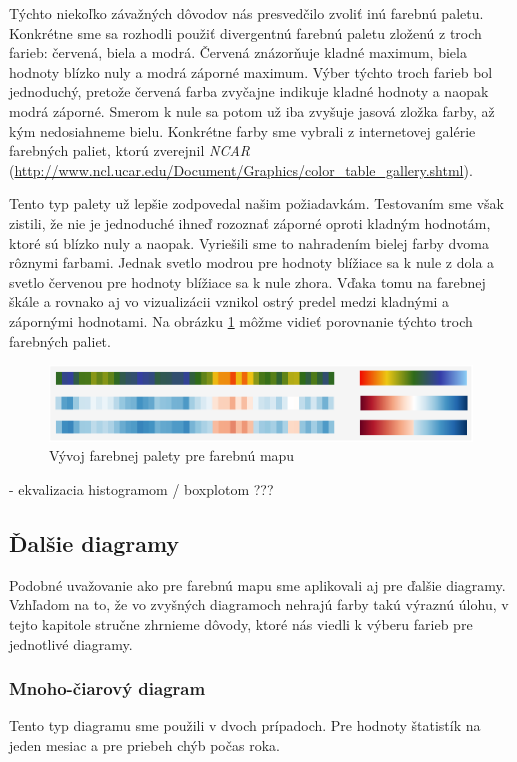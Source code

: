 Týchto niekoľko závažných dôvodov nás presvedčilo zvoliť inú farebnú paletu. Konkrétne sme sa rozhodli použiť divergentnú farebnú paletu zloženú z troch farieb: červená, biela a modrá. Červená znázorňuje kladné maximum, biela hodnoty blízko nuly a modrá záporné maximum. Výber týchto troch farieb bol jednoduchý, pretože červená farba zvyčajne indikuje kladné hodnoty a naopak modrá záporné. Smerom k nule sa potom už iba zvyšuje jasová zložka farby, až kým nedosiahneme bielu. Konkrétne farby sme vybrali z internetovej galérie farebných paliet, ktorú zverejnil \textit{NCAR} (\url{http://www.ncl.ucar.edu/Document/Graphics/color_table_gallery.shtml}).

Tento typ palety už lepšie zodpovedal našim požiadavkám. Testovaním sme však zistili, že nie je jednoduché ihneď rozoznať záporné oproti kladným hodnotám, ktoré sú blízko nuly a naopak. Vyriešili sme to nahradením bielej farby dvoma rôznymi farbami. Jednak svetlo modrou pre hodnoty blížiace sa k nule z dola a svetlo červenou pre hodnoty blížiace sa k nule zhora. Vďaka tomu na farebnej škále a rovnako aj vo vizualizácii vznikol ostrý predel medzi kladnými a zápornými hodnotami. Na obrázku \ref{fig:colorpalettes} môžme vidieť porovnanie týchto troch farebných paliet.


\begin{figure}
	\centering
	\includegraphics[width = 5in]{colorpalettes}
	\caption{Vývoj farebnej palety pre farebnú mapu}
	\label{fig:colorpalettes}
\end{figure}

- ekvalizacia histogramom / boxplotom ??? \\

\subsection{Ďalšie diagramy}
Podobné uvažovanie ako pre farebnú mapu sme aplikovali aj pre ďalšie diagramy. Vzhľadom na to, že vo zvyšných diagramoch nehrajú farby takú výraznú úlohu, v tejto kapitole stručne zhrnieme dôvody, ktoré nás viedli k výberu farieb pre jednotlivé diagramy.

\subsubsection{Mnoho-čiarový diagram} 
Tento typ diagramu sme použili v dvoch prípadoch. Pre hodnoty štatistík na jeden mesiac a pre priebeh chýb počas roka.

